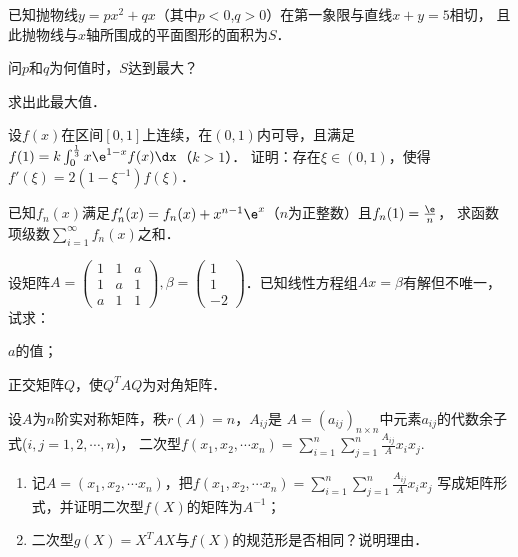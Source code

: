 \documentclass[plain,noanswer,medmath]{../../template/jnuexam}
\begin{document}

\begin{problem}
已知抛物线$y = px^2 + qx$（其中$p < 0$,$q > 0$）在第一象限与直线$x + y = 5$相切，
且此抛物线与$x$轴所围成的平面图形的面积为$S$．\par
\begin{enumerate*}
\item 问$p$和$q$为何值时，$S$达到最大？
\item 求出此最大值．
\end{enumerate*}
\end{problem}



\begin{problem}
设$f(x)$在区间$[0,1]$上连续，在$(0,1)$内可导，且满足$f(1) = k\int_0^{\frac{1}{3}} x\e^{1 - x} f(x)\dx$（$k > 1$）．
证明：存在$\xi \in \left(0,1 \right)$，使得$f'(\xi) = 2(1 - \xi^{-1})f(\xi)$．
\end{problem}



\begin{problem}
已知$f_n(x)$满足$f'_n(x) = f_n(x) + x^{n - 1}\e^x$（$n$为正整数）且$f_n(1) = \frac{\e}{n}$，
求函数项级数$\sum_{i = 1}^{\infty}f_n^{}(x)$之和．
\end{problem}



\begin{problem}
设矩阵$A = \begin{pmatrix}
  1 & 1 & a \\
  1 & a & 1 \\
  a & 1 & 1
\end{pmatrix},\beta = \begin{pmatrix}
  1 \\
  1 \\
  -2
\end{pmatrix}$．已知线性方程组$Ax = \beta$有解但不唯一，试求：
\begin{enumerate*}
\item $a$的值；
\item 正交矩阵$Q$，使$Q^T AQ$为对角矩阵．
\end{enumerate*}
\end{problem}



\begin{problem}
设$A$为$n$阶实对称矩阵，秩$r(A) = n$，$A_{ij}$是
$A = \left(a_{ij} \right)_{n \times n}$中元素$a_{ij}$的代数余子式($i,j = 1,2, \cdots ,n$)，
二次型$f(x_1,x_2, \cdots x_n) = \sum_{i = 1}^n \sum_{j = 1}^n \frac{A_{ij}}{A} x_i x_j.$
\begin{enumerate}
\item 记$A = (x_1,x_2, \cdots x_n)$，把$f(x_1,x_2, \cdots x_n) = \sum_{i = 1}^n \sum_{j = 1}^n \frac{A_{ij}}{A} x_i x_j$
写成矩阵形式，并证明二次型$f(X)$的矩阵为$A^{-1}$；
\item 二次型$g(X) = X^T AX$与$f(X)$的规范形是否相同？说明理由．
\end{enumerate}
\end{problem}
\end{document}

